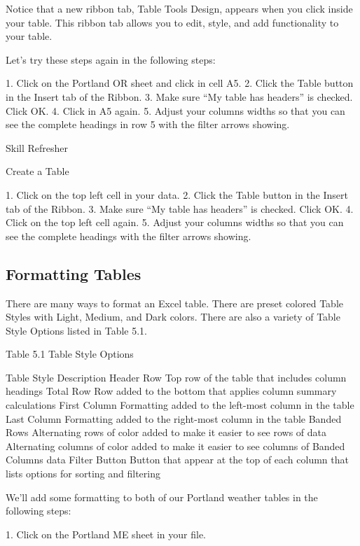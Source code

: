 Notice that a new ribbon tab, Table Tools Design, appears when you click inside your table. This
ribbon tab allows you to edit, style, and add functionality to your table.

Let’s try these steps again in the following steps:

1.    Click on the Portland OR sheet and click in cell A5.
2.    Click the Table button in the Insert tab of the Ribbon.
3.    Make sure “My table has headers” is checked. Click OK.
4.    Click in A5 again.
5.    Adjust your columns widths so that you can see the complete headings in row 5 with the filter
arrows showing.




Skill Refresher


Create a Table

1. Click on the top left cell in your data.
2. Click the Table button in the Insert tab of the Ribbon.
3. Make sure “My table has headers” is checked. Click OK.
4. Click on the top left cell again.
5. Adjust your columns widths so that you can see the complete headings with the filter arrows showing.



\subsection{Formatting Tables}

There are many ways to format an Excel table. There are preset colored Table Styles with Light,
Medium, and Dark colors. There are also a variety of Table Style Options listed in Table 5.1.

Table 5.1 Table Style Options

Table Style          Description
Header Row           Top row of the table that includes column headings
Total Row            Row added to the bottom that applies column summary calculations
First Column         Formatting added to the left-most column in the table
Last Column          Formatting added to the right-most column in the table
Banded Rows          Alternating rows of color added to make it easier to see rows of data
Alternating columns of color added to make it easier to see columns of
Banded Columns
data
Filter Button        Button that appear at the top of each column that lists options for sorting and filtering


We’ll add some formatting to both of our Portland weather tables in the following steps:

1. Click on the Portland ME sheet in your file.

